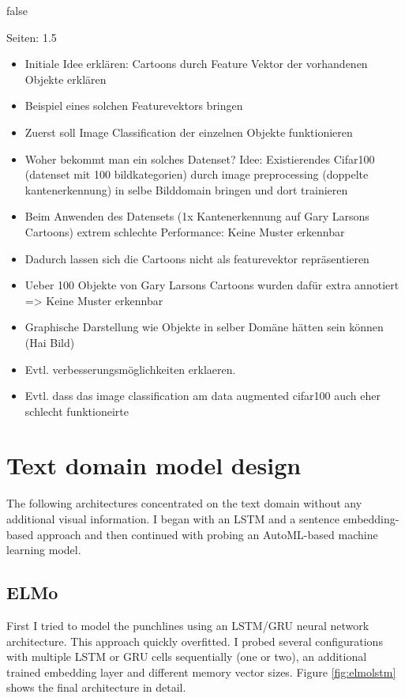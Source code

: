 \documentclass[draft,final,oneside]{vutinfth} %
\begin{document}
\if false

Seiten: 1.5

\begin{itemize}
\item Initiale Idee erklären: Cartoons durch Feature Vektor der vorhandenen Objekte erklären
\item Beispiel eines solchen Featurevektors bringen
\item Zuerst soll Image Classification der einzelnen Objekte funktionieren
\item Woher bekommt man ein solches Datenset? Idee: Existierendes Cifar100 (datenset mit 100 bildkategorien) durch image preprocessing (doppelte kantenerkennung) in selbe Bilddomain bringen und dort trainieren
\item Beim Anwenden des Datensets (1x Kantenerkennung auf Gary Larsons Cartoons) extrem schlechte Performance: Keine Muster erkennbar
\item Dadurch lassen sich die Cartoons nicht als featurevektor repräsentieren
\item Ueber 100 Objekte von Gary Larsons Cartoons wurden dafür extra annotiert => Keine Muster erkennbar
\item Graphische Darstellung wie Objekte in selber Domäne hätten sein können (Hai Bild)
\item Evtl. verbesserungsmöglichkeiten erklaeren.
\item Evtl. dass das image classification am data augmented cifar100 auch eher schlecht funktioneirte
\end{itemize}

\fi

\section{Text domain model design}

The following architectures concentrated on the text domain without any additional visual information. I began with an LSTM and a sentence embedding-based approach and then continued with probing an AutoML-based machine learning model.

\subsection{ELMo}

First I tried to model the punchlines using an LSTM/GRU neural network architecture. This approach quickly overfitted. I probed several configurations with multiple LSTM or GRU cells sequentially (one or two), an additional trained embedding layer and different memory vector sizes. Figure \ref{fig:elmolstm} shows the final architecture in detail.
\end{document}
